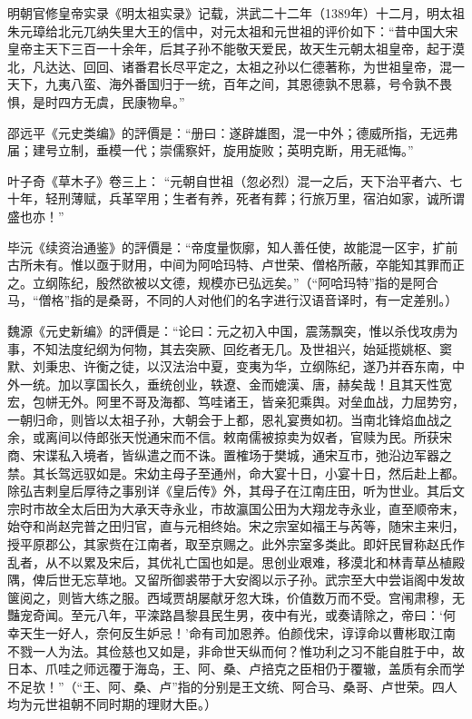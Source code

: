 明朝官修皇帝实录《明太祖实录》记载，洪武二十二年（1389年）十二月，明太祖朱元璋给北元兀纳失里大王的信中，对元太祖和元世祖的评价如下：“昔中国大宋皇帝主天下三百一十余年，后其子孙不能敬天爱民，故天生元朝太祖皇帝，起于漠北，凡达达、回回、诸番君长尽平定之，太祖之孙以仁德著称，为世祖皇帝，混一天下，九夷八蛮、海外番国归于一统，百年之间，其恩德孰不思慕，号令孰不畏惧，是时四方无虞，民康物阜。”

邵远平《元史类编》的評價是：“册曰：遂辟雄图，混一中外；德威所指，无远弗届；建号立制，垂模一代；崇儒察奸，旋用旋败；英明克断，用无祗悔。”

叶子奇《草木子》卷三上： “元朝自世祖（忽必烈）混一之后，天下治平者六、七十年，轻刑薄赋，兵革罕用；生者有养，死者有葬；行旅万里，宿泊如家，诚所谓盛也亦！”

毕沅《续资治通鉴》的評價是：“帝度量恢廓，知人善任使，故能混一区宇，扩前古所未有。惟以亟于财用，中间为阿哈玛特、卢世荣、僧格所蔽，卒能知其罪而正之。立纲陈纪，殷然欲被以文德，规模亦已弘远矣。”（“阿哈玛特”指的是阿合马，“僧格”指的是桑哥，不同的人对他们的名字进行汉语音译时，有一定差别。）

魏源《元史新编》的評價是：“论曰：元之初入中国，震荡飘突，惟以杀伐攻虏为事，不知法度纪纲为何物，其去突厥、回纥者无几。及世祖兴，始延揽姚枢、窦默、刘秉忠、许衡之徒，以汉法治中夏，变夷为华，立纲陈纪，遂乃并吞东南，中外一统。加以享国长久，垂统创业，轶遼、金而媲漢、唐，赫矣哉！且其天性宽宏，包帡无外。阿里不哥及海都、笃哇诸王，皆亲犯乘舆。对垒血战，力屈势穷，一朝归命，则皆以太祖子孙，大朝会于上都，恩礼宴赉如初。当南北锋焰血战之余，或离间以侍郎张天悦通宋而不信。敕南儒被掠卖为奴者，官赎为民。所获宋商、宋谍私入境者，皆纵遣之而不诛。置榷场于樊城，通宋互市，弛沿边军器之禁。其长驾远驭如是。宋幼主母子至通州，命大宴十日，小宴十日，然后赴上都。除弘吉剌皇后厚待之事别详《皇后传》外，其母子在江南庄田，听为世业。其后文宗时市故全太后田为大承天寺永业，市故瀛国公田为大翔龙寺永业，直至顺帝末，始夺和尚赵完普之田归官，直与元相终始。宋之宗室如福王与芮等，随宋主来归，授平原郡公，其家赀在江南者，取至京赐之。此外宗室多类此。即奸民冒称赵氏作乱者，从不以累及宋后，其优礼亡国也如是。思创业艰难，移漠北和林青草丛植殿隅，俾后世无忘草地。又留所御裘带于大安阁以示子孙。武宗至大中尝诣阁中发故箧阅之，则皆大练之服。西域贾胡屡献牙忽大珠，价值数万而不受。宫闱肃穆，无豔宠奇闻。至元八年，平滦路昌黎县民生男，夜中有光，或奏请除之，帝曰：‘何幸天生一好人，奈何反生妒忌！’命有司加恩养。伯颜伐宋，谆谆命以曹彬取江南不戮一人为法。其俭慈也又如是，非命世天纵而何？惟功利之习不能自胜于中，故日本、爪哇之师远覆于海岛，王、阿、桑、卢掊克之臣相仍于覆辙，盖质有余而学不足欤！”（“王、阿、桑、卢”指的分别是王文统、阿合马、桑哥、卢世荣。四人均为元世祖朝不同时期的理财大臣。）

